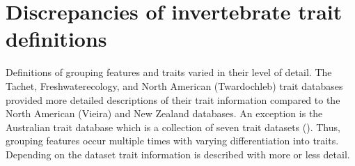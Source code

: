 \documentclass[../Draft_harmonization_paper.tex]{subfiles}
\begin{document}

\section{Discrepancies of invertebrate trait definitions}

Definitions of grouping features and traits varied in their level of detail. The Tachet, Freshwaterecology, and North American (Twardochleb) trait databases provided more detailed descriptions of their trait information compared to the North American (Vieira) and New Zealand databases. An exception is the Australian trait database which is a collection of seven trait datasets (\cite{kefford_integrated_2020}). Thus, grouping features occur multiple times with varying differentiation into traits. Depending on the dataset trait information is described with more or less detail. %
\end{document}
